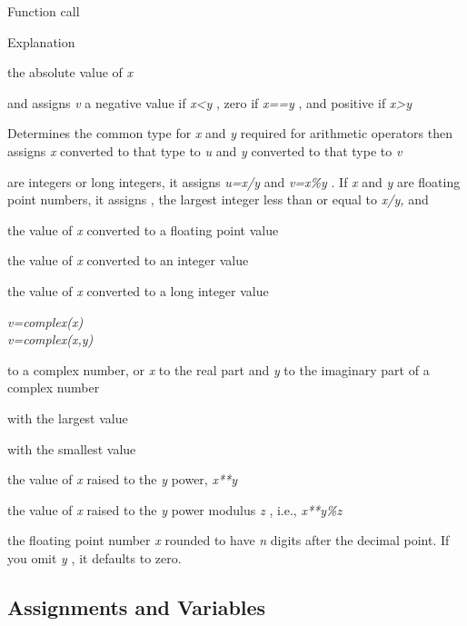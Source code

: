 Function call

Explanation



 the absolute
value of \emph{x}



 and
assigns \emph{v} a negative value if \emph{x\textless{}y} , zero if
\emph{x==y} , and positive if \emph{x\textgreater{}y}



Determines the common type for
\emph{x} and \emph{y} required for arithmetic operators then assigns
\emph{x} converted to that type to \emph{u} and \emph{y} converted to
that type to \emph{v}



 are
integers or long integers, it assigns \emph{u=x/y} and \emph{v=x\%y} .
If \emph{x} and \emph{y} are floating point numbers, it assigns
, the largest integer less than or equal
to \emph{x/y,} and



 the value of
\emph{x} converted to a floating point value



 the value of
\emph{x} converted to an integer value



 the value of
\emph{x} converted to a long integer value

 \emph{v=complex(x)\\
v=complex(x,y)}

 to a complex
number, or \emph{x} to the real part and \emph{y} to the imaginary part
of a complex number



 with
the largest value



 with
the smallest value



 the value of
\emph{x} raised to the \emph{y} power, \emph{x**y}



 the value of
\emph{x} raised to the \emph{y} power modulus \emph{z} , i.e.,
\emph{x**y\%z}



 the floating
point number \emph{x} rounded to have \emph{n} digits after the decimal
point. If you omit \emph{y} , it defaults to zero.

\subsection{Assignments and Variables}
\label{assignments-and-variables}

